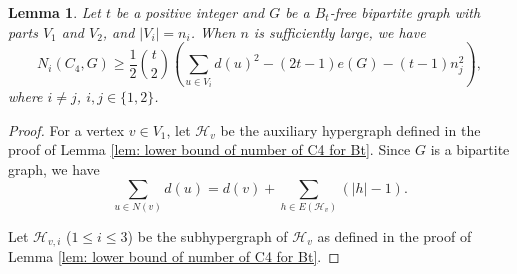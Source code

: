 \documentclass[11pt,a4paper]{article}
\newtheorem{lemma}{Lemma}[section]
\theoremstyle{definition}
\begin{document}
        \begin{lemma}\label{lem: lower bound of number of C4 for Bt on bip}
            Let $t$ be a positive integer and $G$ be a $B_t$-free bipartite graph with parts $V_1$ and $V_2$, and $|V_i| = n_i$.
            When $n$ is sufficiently large, we have
            \begin{equation*}
                N_i(C_4, G) \geq \frac{1}{2} \binom{t}{2} \left(\sum_{u \in V_i} d(u)^2 - (2t-1) e(G) - (t-1) n_j^2 \right),
            \end{equation*}
            where $i \neq j$, $i, j \in \{1, 2\}$.
        \end{lemma}

        \begin{proof}
            For a vertex $v \in V_1$, let $\mathcal{H}_v$ be the auxiliary hypergraph defined in the proof of Lemma \ref{lem: lower bound of number of C4 for Bt}.
            Since $G$ is a bipartite graph, we have
            \begin{equation}\label{eq: sum of dv bip}
                \sum_{u \in N(v)} d(u) = d(v) + \sum_{h \in E(\mathcal{H}_v)} (|h| - 1).
            \end{equation}

            Let $\mathcal{H}_{v, i}$ ($1 \leq i \leq 3$) be the subhypergraph of $\mathcal{H}_v$ as defined in the proof of Lemma \ref{lem: lower bound of number of C4 for Bt}.


\end{proof}
\end{document}
